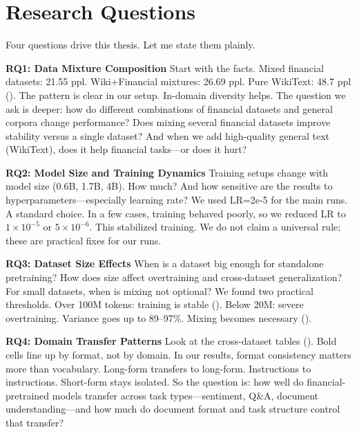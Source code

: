 \section{Research Questions}

Four questions drive this thesis. Let me state them plainly.

\textbf{RQ1: Data Mixture Composition}
Start with the facts. Mixed financial datasets: 21.55 ppl. Wiki+Financial mixtures: 26.69 ppl. Pure WikiText: 48.7 ppl (). The pattern is clear in our setup. In-domain diversity helps. The question we ask is deeper: how do different combinations of financial datasets and general corpora change performance? Does mixing several financial datasets improve stability versus a single dataset? And when we add high-quality general text (WikiText), does it help financial tasks—or does it hurt?

\textbf{RQ2: Model Size and Training Dynamics}
Training setups change with model size (0.6B, 1.7B, 4B). How much? And how sensitive are the results to hyperparameters—especially learning rate? We used LR=2e-5 for the main runs. A standard choice. In a few cases, training behaved poorly, so we reduced LR to $1\times10^{-5}$ or $5\times10^{-6}$. This stabilized training. We do not claim a universal rule; these are practical fixes for our runs.

\textbf{RQ3: Dataset Size Effects}
When is a dataset big enough for standalone pretraining? How does size affect overtraining and cross-dataset generalization? For small datasets, when is mixing not optional? We found two practical thresholds. Over 100M tokens: training is stable (). Below 20M: severe overtraining. Variance goes up to 89--97\%. Mixing becomes necessary ().

\textbf{RQ4: Domain Transfer Patterns}
Look at the cross-dataset tables (). Bold cells line up by format, not by domain. In our results, format consistency matters more than vocabulary. Long-form transfers to long-form. Instructions to instructions. Short-form stays isolated. So the question is: how well do financial-pretrained models transfer across task types—sentiment, Q\&A, document understanding—and how much do document format and task structure control that transfer?

